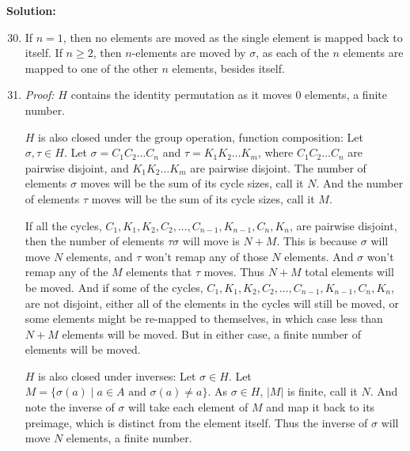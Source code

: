 \documentclass[12pt, letterpaper]{article}
\newenvironment{solution}
    [0]
    {\noindent \textbf{Solution:}} 
    {\vspace{3mm}}
\begin{document}
\begin{solution}
    \begin{enumerate}
        \setcounter{enumi}{29}

        \item If $n = 1$, then no elements are moved as the single element is mapped back to itself.
        If $n \ge 2$, then $n$-elements are moved by $\sigma$, as each of the $n$ elements are mapped
        to one of the other $n$ elements, besides itself.

        \item \emph{Proof:} $H$ contains the identity permutation as it moves 0 elements, a finite number. 
        
        \bigskip\noindent
        $H$ is also  closed under the group operation, function composition: Let $\sigma, \tau \in H$. Let $\sigma = 
        C_1 C_2 \ldots C_n$ and $\tau = K_1 K_2 \ldots K_m$, where $C_1 C_2 \ldots C_n$ are pairwise disjoint, and 
        $K_1 K_2 \ldots K_m$ are pairwise disjoint. The number of elements $\sigma$ moves will be the sum of its 
        cycle sizes, call it $N$. And the number of elements $\tau$ moves will be the sum of its cycle sizes, call 
        it $M$.
        
        \bigskip\noindent
        If all the cycles, $C_1, K_1, K_2, C_2, \ldots, C_{n-1}, K_{n-1}, C_n, K_n$, are pairwise disjoint, 
        then the number of elements $\tau\sigma$ will move is $N + M$. This is because $\sigma$ will move
        $N$ elements, and $\tau$ won't remap any of those $N$ elements. And $\sigma$ won't remap any of the 
        $M$ elements that $\tau$ moves. Thus $N + M$ total elements will be moved. And if some of the cycles,
        $C_1, K_1, K_2, C_2, \ldots, C_{n-1}, K_{n-1}, C_n, K_n$, are not disjoint, either all of the elements
        in the cycles will still be moved, or some elements might be re-mapped to themselves, in which case less
        than $N + M$ elements will be moved. But in either case, a finite number of elements will be moved.

        \bigskip\noindent
        $H$ is also closed under inverses: Let $\sigma \in H$. Let $M = \{\sigma(a) \;|\; a \in A \text{ and } \sigma(a) \neq a\}$.
        As $\sigma \in H$, $|M|$ is finite, call it $N$. And note the inverse of $\sigma$ will take each element of $M$ and map 
        it back to its preimage, which is distinct from the element itself. Thus the inverse of $\sigma$ will move $N$ elements,
        a finite number.
        

\end{enumerate}
\end{solution}
\end{document}
